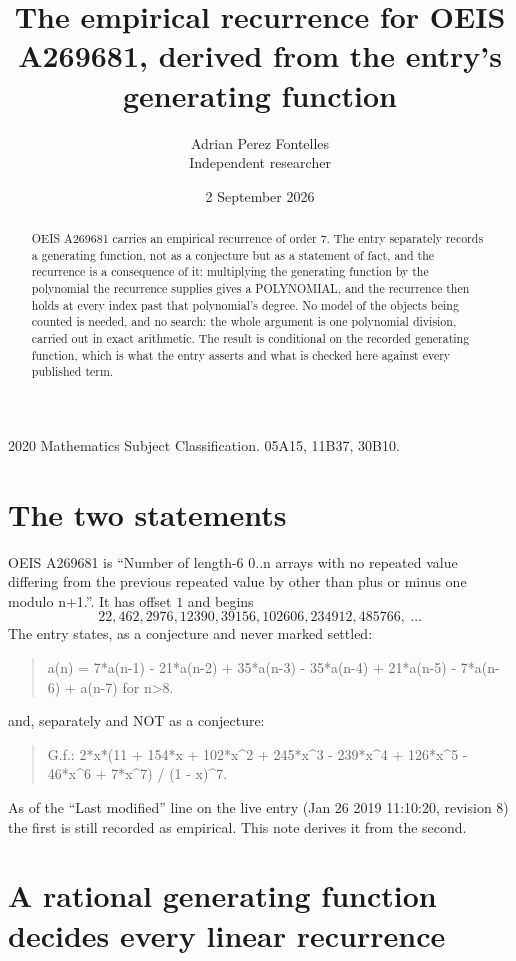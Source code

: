 \documentclass[11pt,a4paper]{article}
\title{The empirical recurrence for OEIS A269681, derived from the entry's generating function}
\author{Adrian Perez Fontelles\\ \small Independent researcher}
\date{2 September 2026}
\theoremstyle{plain}
\theoremstyle{definition}
\begin{document}
\maketitle

\begin{abstract}
OEIS A269681 carries an empirical recurrence of order $7$. The entry separately records a
generating function, not as a conjecture but as a statement of fact, and the recurrence is a
consequence of it: multiplying the generating function by the polynomial the recurrence
supplies gives a POLYNOMIAL, and the recurrence then holds at every index past that
polynomial's degree. No model of the objects being counted is needed, and no search: the
whole argument is one polynomial division, carried out in exact arithmetic. The result is
conditional on the recorded generating function, which is what the entry asserts and what is
checked here against every published term.
\end{abstract}

\noindent\small 2020 Mathematics Subject Classification. 05A15, 11B37, 30B10.\normalsize

\section{The two statements}

OEIS A269681 is ``Number of length-6 0..n arrays with no repeated value differing from the previous repeated value by other than plus or minus one modulo n+1.''. It has offset $1$ and begins
\[
22, 462, 2976, 12390, 39156, 102606, 234912, 485766,\ \dots
\]
The entry states, as a conjecture and never marked settled:
\begin{quote}
a(n) = 7*a(n-1) - 21*a(n-2) + 35*a(n-3) - 35*a(n-4) + 21*a(n-5) - 7*a(n-6) + a(n-7) for n>8.
\end{quote}
and, separately and NOT as a conjecture:
\begin{quote}
G.f.: 2*x*(11 + 154*x + 102*x\^{}2 + 245*x\^{}3 - 239*x\^{}4 + 126*x\^{}5 - 46*x\^{}6 + 7*x\^{}7) / (1 - x)\^{}7.
\end{quote}
As of the ``Last modified'' line on the live entry (Jan 26 2019 11:10:20, revision 8) the first is still
recorded as empirical. This note derives it from the second.

\section{A rational generating function decides every linear recurrence}
\end{document}
